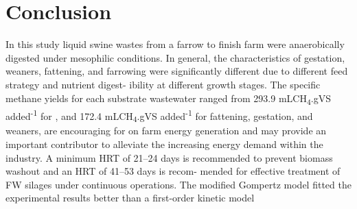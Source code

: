 \section{Conclusion}
In this study liquid swine wastes from a farrow to finish farm were anaerobically digested under mesophilic conditions. In general, the characteristics of gestation, weaners, fattening, and farrowing were significantly different due to different feed strategy and nutrient digest- ibility at different growth stages. The specific methane yields for each substrate wastewater ranged from 293.9 mLCH\textsubscript{4}.gVS added\textsuperscript{-1} for , and 172.4 mLCH\textsubscript{4}.gVS added\textsuperscript{-1} for fattening, gestation, and weaners, are encouraging for on farm energy generation and may provide an important contributor to alleviate the increasing energy demand within the industry. A minimum HRT of 21–24 days is recommended to prevent biomass washout and an HRT of 41–53 days is recom- mended for effective treatment of FW silages under continuous operations. The modified Gompertz model fitted the experimental results better than a first-order kinetic model